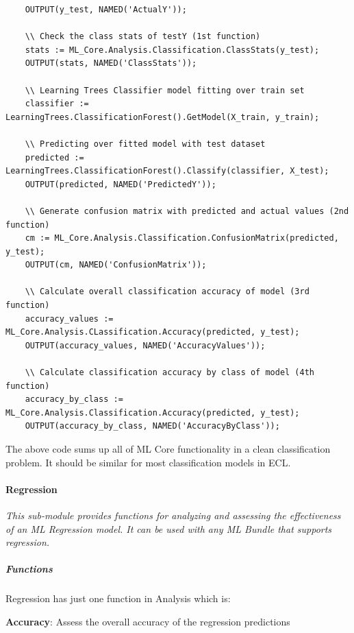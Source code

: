 \documentclass[a4paper,oneside,12pt]{book}
\begin{document}
\begin{lstlisting}
    OUTPUT(y_test, NAMED('ActualY'));
    
    \\ Check the class stats of testY (1st function)
    stats := ML_Core.Analysis.Classification.ClassStats(y_test);
    OUTPUT(stats, NAMED('ClassStats'));
    
    \\ Learning Trees Classifier model fitting over train set
    classifier := LearningTrees.ClassificationForest().GetModel(X_train, y_train);
    
    \\ Predicting over fitted model with test dataset
    predicted := LearningTrees.ClassificationForest().Classify(classifier, X_test);
    OUTPUT(predicted, NAMED('PredictedY'));
    
    \\ Generate confusion matrix with predicted and actual values (2nd function)
    cm := ML_Core.Analysis.Classification.ConfusionMatrix(predicted, y_test);
    OUTPUT(cm, NAMED('ConfusionMatrix'));
    
    \\ Calculate overall classification accuracy of model (3rd function)
    accuracy_values := ML_Core.Analysis.CLassification.Accuracy(predicted, y_test);
    OUTPUT(accuracy_values, NAMED('AccuracyValues'));
    
    \\ Calculate classification accuracy by class of model (4th function)
    accuracy_by_class := ML_Core.Analysis.Classification.Accuracy(predicted, y_test);
    OUTPUT(accuracy_by_class, NAMED('AccuracyByClass'));
\end{lstlisting}

The above code sums up all of ML Core functionality in a clean classification problem. It should be similar for most classification models in ECL.

\paragraph{Regression}\label{analysis:regression}

\textit{This sub-module provides functions for analyzing and assessing the effectiveness of an ML Regression model. It can be used with any ML Bundle that supports regression.}

\subparagraph{Functions}

Regression has just one function in Analysis which is:

\textbf{Accuracy}: Assess the overall accuracy of the regression predictions
\end{document}
